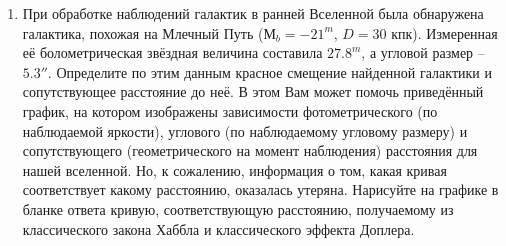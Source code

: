\documentclass[12pt]{article}
\begin{document}
\begin{enumerate}
    \newpage
    \item При обработке наблюдений галактик в ранней Вселенной была обнаружена галактика, похожая на Млечный Путь ($М_b = -21^m$, $D = 30$ кпк). Измеренная её болометрическая звёздная величина составила $27.8^m$, а угловой размер -- $5.3''$. Определите по этим данным красное смещение найденной галактики и сопутствующее расстояние до неё.
    В этом Вам может помочь приведённый график, на котором изображены зависимости фотометрического (по наблюдаемой яркости), углового (по наблюдаемому угловому размеру) и сопутствующего (геометрического на момент наблюдения) расстояния для нашей вселенной. Но, к сожалению, информация о том, какая кривая соответствует какому расстоянию, оказалась утеряна.
    Нарисуйте на графике в бланке ответа кривую, соответствующую расстоянию, получаемому из классического закона Хаббла и классического эффекта Доплера.
    \begin{figure}[h]
    \end{figure}
\end{enumerate}
\end{document}
